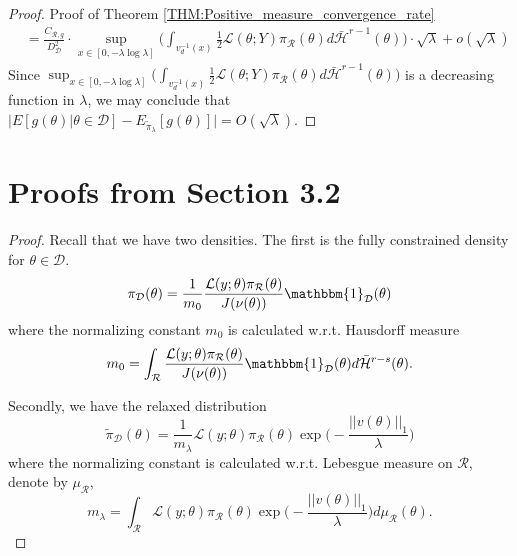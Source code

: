 \documentclass[10pt,fleqn]{article}
\DeclareMathOperator{\1}{\mathbbm{1}}
\begin{document}
{\begin{proof}{Proof of Theorem \ref{THM:Positive_measure_convergence_rate}}
\begin{align*}
&= \frac{C_{\mathcal{R},g}}{D_\mathcal{D}^2} \cdot \sup_{x \in [0,-\lambda\log\lambda]} \bigg( \int_{v_d^{-1}(x)} \frac{1}{2}\mathcal{L}(\theta;Y) \pi_\mathcal{R}(\theta) d\bar{\mathcal{H}}^{r-1}(\theta)\bigg)  \cdot \sqrt{\lambda} + o(\sqrt{\lambda})
\end{align*}
Since $\sup_{x \in [0,-\lambda\log\lambda]} \bigg( \int_{v_d^{-1}(x)} \frac{1}{2}\mathcal{L}(\theta;Y) \pi_\mathcal{R}(\theta) d\bar{\mathcal{H}}^{r-1}(\theta)\bigg)$ is a decreasing function in $\lambda$, we may conclude that $\big| E[g(\theta)|\theta\in\mathcal{D}]-E_{\tilde{\pi}_\lambda}[g(\theta)]\big| = O(\sqrt{\lambda}).$
\end{proof}

\section{Proofs from Section 3.2}

\begin{proof}
Recall that we have two densities. The first is the fully constrained density for $\theta\in\mathcal{D}$.
\begin{equation*}
\pi_\mathcal{D}(\theta) = \frac{1}{m_0} \frac{\mathcal{L}(y;\theta)\pi_\mathcal{R}(\theta)}{J(\nu(\theta))}\mathbbm{1}_\mathcal{D}(\theta)
\end{equation*}
where the normalizing constant $m_0$ is calculated w.r.t. Hausdorff measure
$$m_0 = \int_\mathcal{R} \frac{\mathcal{L}(y;\theta)\pi_\mathcal{R}(\theta)}{J(\nu(\theta))}\mathbbm{1}_\mathcal{D}(\theta)d\bar{\mathcal{H}}^{r-s}(\theta).$$

Secondly, we have the relaxed distribution
$$\tilde{\pi}_\mathcal{D}(\theta) = \frac{1}{m_\lambda} \mathcal{L}(y;\theta)\pi_\mathcal{R}(\theta)\exp\bigg(-\frac{||v(\theta)||_1}{\lambda}\bigg)$$
where the normalizing constant is calculated w.r.t. Lebesgue measure on $\mathcal{R}$, denote by $\mu_\mathcal{R}$,
$$m_\lambda = \int_\mathcal{R}\mathcal{L}(y;\theta)\pi_\mathcal{R}(\theta)\exp\bigg(-\frac{||v(\theta)||_1}{\lambda}\bigg) d\mu_\mathcal{R}(\theta).$$


\end{proof}}
\end{document}
